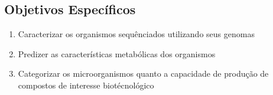 \subsection{Objetivos Específicos}
\begin{enumerate}
    \item Caracterizar os organismos sequênciados utilizando seus genomas
    \item Predizer as características metabólicas dos organismos
    \item Categorizar os microorganismos quanto a capacidade de produção de compostos de interesse biotécnológico
\end{enumerate}





